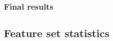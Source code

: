 \subsubsection{Final results}
%


\newpage
\subsection{Feature set statistics}
\label{appendix:fs}


